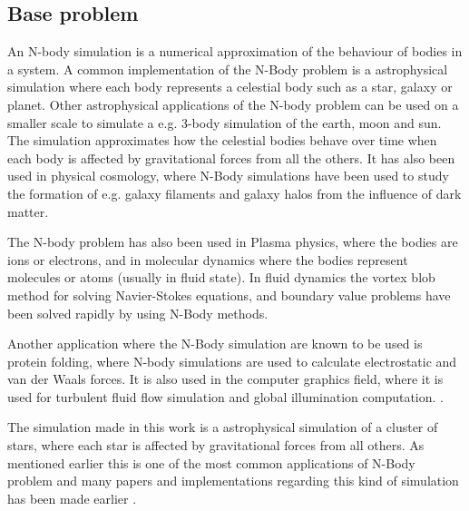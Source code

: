 \subsection{Base problem}
An N-body simulation is a numerical approximation of the behaviour of bodies in a system. A common implementation of the N-Body problem is a astrophysical simulation where each body represents a celestial body such as a star, galaxy or planet. Other astrophysical applications of the N-body problem can be used on a smaller scale to simulate a e.g. 3-body simulation of the earth, moon and sun. The simulation approximates how the celestial bodies behave over time when each body is affected by gravitational forces from all the others. It has also been used in physical cosmology, where N-Body simulations have been used to study the formation of e.g. galaxy filaments and galaxy halos from the influence of dark matter. \cite{navarro1996structure}

The N-body problem has also been used in Plasma physics, where the bodies are ions or electrons, and in molecular dynamics where the bodies represent molecules or atoms (usually in fluid state). In fluid dynamics the vortex blob method for solving Navier-Stokes equations, and boundary value problems have been solved rapidly by using N-Body methods. \cite{greengard1988rapid}

Another application where the N-Body simulation are known to be used is protein folding, where N-body simulations are used to calculate electrostatic and van der
Waals forces. It is also used in the computer graphics field, where it is used for turbulent fluid flow simulation and global illumination computation. \cite{nyland2007fast}.

The simulation made in this work is a astrophysical simulation of a cluster of stars, where each star is affected by gravitational forces from all others. As mentioned earlier this is one of the most common applications of N-Body problem and many papers and implementations regarding this kind of simulation has been made earlier \cite{aarseth2003gravitational}\cite{burtscher2011efficient}\cite{nyland2007fast}. 

